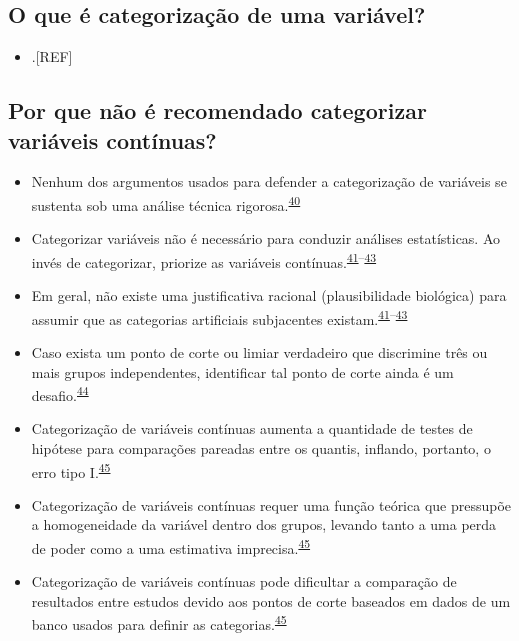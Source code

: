 \documentclass[
]{book}
\providecommand{\tightlist}{%
  \setlength{\itemsep}{0pt}\setlength{\parskip}{0pt}}
\begin{document}
\hypertarget{o-que-uxe9-categorizauxe7uxe3o-de-uma-variuxe1vel}{%
\subsection{O que é categorização de uma variável?}\label{o-que-uxe9-categorizauxe7uxe3o-de-uma-variuxe1vel}}

\begin{itemize}
\tightlist
\item
  .{[}REF{]}
\end{itemize}

\hypertarget{por-que-nuxe3o-uxe9-recomendado-categorizar-variuxe1veis-contuxednuas}{%
\subsection{Por que não é recomendado categorizar variáveis contínuas?}\label{por-que-nuxe3o-uxe9-recomendado-categorizar-variuxe1veis-contuxednuas}}

\begin{itemize}
\item
  Nenhum dos argumentos usados para defender a categorização de variáveis se sustenta sob uma análise técnica rigorosa.\textsuperscript{\protect\hyperlink{ref-MacCallum2002}{40}}
\item
  Categorizar variáveis não é necessário para conduzir análises estatísticas. Ao invés de categorizar, priorize as variáveis contínuas.\textsuperscript{\protect\hyperlink{ref-Altman2006}{41}--\protect\hyperlink{ref-Collins2016}{43}}
\item
  Em geral, não existe uma justificativa racional (plausibilidade biológica) para assumir que as categorias artificiais subjacentes existam.\textsuperscript{\protect\hyperlink{ref-Altman2006}{41}--\protect\hyperlink{ref-Collins2016}{43}}
\item
  Caso exista um ponto de corte ou limiar verdadeiro que discrimine três ou mais grupos independentes, identificar tal ponto de corte ainda é um desafio.\textsuperscript{\protect\hyperlink{ref-Prince2017}{44}}
\item
  Categorização de variáveis contínuas aumenta a quantidade de testes de hipótese para comparações pareadas entre os quantis, inflando, portanto, o erro tipo I.\textsuperscript{\protect\hyperlink{ref-Bennette2012}{45}}
\item
  Categorização de variáveis contínuas requer uma função teórica que pressupõe a homogeneidade da variável dentro dos grupos, levando tanto a uma perda de poder como a uma estimativa imprecisa.\textsuperscript{\protect\hyperlink{ref-Bennette2012}{45}}
\item
  Categorização de variáveis contínuas pode dificultar a comparação de resultados entre estudos devido aos pontos de corte baseados em dados de um banco usados para definir as categorias.\textsuperscript{\protect\hyperlink{ref-Bennette2012}{45}}
\end{itemize}
\end{document}
